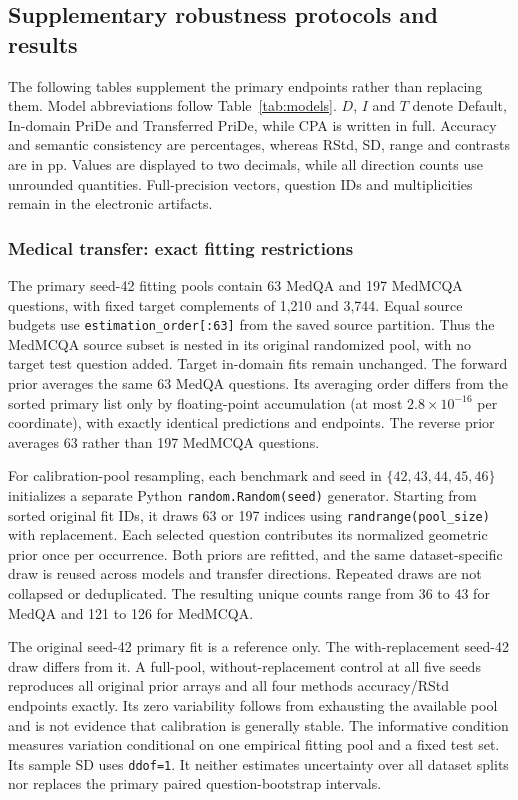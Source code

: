 \FloatBarrier\subsection{Supplementary robustness protocols and results}\label{app:robustness}

The following tables supplement the primary endpoints rather than replacing them. Model abbreviations follow Table~\ref{tab:models}. $D$, $I$ and $T$ denote Default, In-domain PriDe and Transferred PriDe, while CPA is written in full. Accuracy and semantic consistency are percentages, whereas RStd, SD, range and contrasts are in pp. Values are displayed to two decimals, while all direction counts use unrounded quantities. Full-precision vectors, question IDs and multiplicities remain in the electronic artifacts.

\subsubsection{Medical transfer: exact fitting restrictions}\label{app:robustness-transfer}

The primary seed-42 fitting pools contain 63 MedQA and 197 MedMCQA questions, with fixed target complements of 1,210 and 3,744. Equal source budgets use \texttt{estimation\_order[:63]} from the saved source partition. Thus the MedMCQA source subset is nested in its original randomized pool, with no target test question added. Target in-domain fits remain unchanged. The forward prior averages the same 63 MedQA questions. Its averaging order differs from the sorted primary list only by floating-point accumulation (at most $2.8\times10^{-16}$ per coordinate), with exactly identical predictions and endpoints. The reverse prior averages 63 rather than 197 MedMCQA questions.

For calibration-pool resampling, each benchmark and seed in $\{42,43,44,45,46\}$ initializes a separate Python \texttt{random.Random(seed)} generator. Starting from sorted original fit IDs, it draws 63 or 197 indices using \texttt{randrange(pool\_size)} with replacement. Each selected question contributes its normalized geometric prior once per occurrence. Both priors are refitted, and the same dataset-specific draw is reused across models and transfer directions. Repeated draws are not collapsed or deduplicated. The resulting unique counts range from 36 to 43 for MedQA and 121 to 126 for MedMCQA.

The original seed-42 primary fit is a reference only. The with-replacement seed-42 draw differs from it. A full-pool, without-replacement control at all five seeds reproduces all original prior arrays and all four methods\textquotesingle{} accuracy/RStd endpoints exactly. Its zero variability follows from exhausting the available pool and is not evidence that calibration is generally stable. The informative condition measures variation conditional on one empirical fitting pool and a fixed test set. Its sample SD uses \texttt{ddof=1}. It neither estimates uncertainty over all dataset splits nor replaces the primary paired question-bootstrap intervals.

